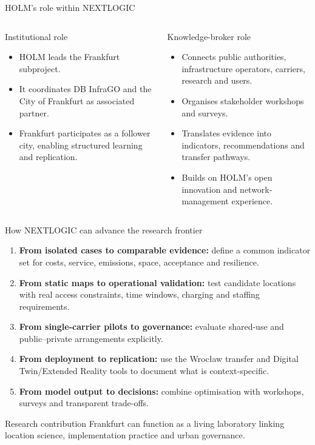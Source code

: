 \documentclass[aspectratio=169,11pt]{beamer}
\newcommand{\source}[1]{\par\vspace{2pt}{\tiny\textcolor{gray}{Source: #1}}}
\begin{document}
\begin{frame}{HOLM's role within NEXTLOGIC}
\begin{columns}[T]
\begin{block}{Institutional role}
\begin{itemize}
  \item HOLM leads the Frankfurt subproject.
  \item It coordinates DB InfraGO and the City of Frankfurt as associated partner.
  \item Frankfurt participates as a follower city, enabling structured learning and replication.
\end{itemize}
\end{block}
\begin{block}{Knowledge-broker role}
\begin{itemize}
  \item Connects public authorities, infrastructure operators, carriers, research and users.
  \item Organises stakeholder workshops and surveys.
  \item Translates evidence into indicators, recommendations and transfer pathways.
  \item Builds on HOLM's open innovation and network-management experience.
\end{itemize}
\end{block}
\end{columns}
\source{HOLM, “Vision \& Strategie”; HOLM, “HORIZON-Projekt NEXTLOGIC in Frankfurt am Main”; HOLM campaign documentation.}
\end{frame}

\begin{frame}{How NEXTLOGIC can advance the research frontier}
\begin{enumerate}
  \item \textbf{From isolated cases to comparable evidence:} define a common indicator set for costs, service, emissions, space, acceptance and resilience.
  \item \textbf{From static maps to operational validation:} test candidate locations with real access constraints, time windows, charging and staffing requirements.
  \item \textbf{From single-carrier pilots to governance:} evaluate shared-use and public--private arrangements explicitly.
  \item \textbf{From deployment to replication:} use the Wrocław transfer and Digital Twin/Extended Reality tools to document what is context-specific.
  \item \textbf{From model output to decisions:} combine optimisation with workshops, surveys and transparent trade-offs.
\end{enumerate}
\begin{alertblock}{Research contribution}
Frankfurt can function as a living laboratory linking location science, implementation practice and urban governance.
\end{alertblock}
\end{frame}
\end{document}
